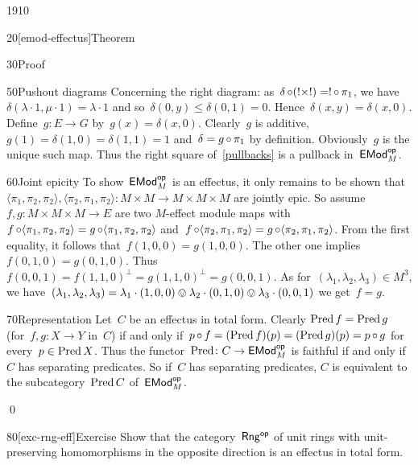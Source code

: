 \begin{parsec}{1910}
\begin{point}{20}[emod-effectus]{Theorem}
\begin{point}{30}{Proof}
\begin{point}{50}{Pushout diagrams}
Concerning the right diagram:
    as~$\delta \mathop{\circ} (!\times!) = ! \mathop{\circ} \pi_1$,
    we have~$\delta(\lambda \cdot 1, \mu \cdot 1) = \lambda \cdot 1$
    and so~$\delta(0, y) \leq \delta(0,1) = 0$.
    Hence~$\delta(x,y) = \delta(x,0)$.
Define~$g\colon E \to G$ by~$g(x) = \delta(x,0)$.
Clearly~$g$ is additive, $g(1) = \delta(1,0) = \delta(1,1) = 1$
    and~$\delta = g \mathop{\circ} \pi_1$ by definition.
Obviously~$g$ is the unique such map.
Thus the right square of~\eqref{pullbacks}
    is a pullback in~$\mathsf{EMod}_M^{\mathsf{op}}$.
\end{point}
\begin{point}{60}{Joint epicity}%
To show~$\mathsf{EMod}^{\mathsf{op}}_M$ is an effectus,
    it only remains to be shown
    that~$
    \langle \pi_1, \pi_2, \pi_2\rangle,
    \langle \pi_2, \pi_1, \pi_2\rangle\colon M \times M \to M \times M \times M
    $ are jointly epic.
So assume~$f,g\colon M \times M \times M \to E$
    are two $M$-effect module maps
    with~$
        f \mathop{\circ} \langle \pi_1,\pi_2,\pi_2\rangle =
        g \mathop{\circ} \langle \pi_1,\pi_2,\pi_2\rangle$
        and~$
        f \mathop{\circ} \langle \pi_2,\pi_1,\pi_2\rangle =
        g \mathop{\circ} \langle \pi_2,\pi_1,\pi_2\rangle$.
From the first equality, it follows that~$f(1,0,0) = g(1,0,0)$.
The other one implies~$f(0,1,0) = g(0,1,0)$.
Thus~$f(0,0,1) = f(1,1,0)^\perp = g(1,1,0)^\perp = g(0,0,1)$.
As for~$(\lambda_1,\lambda_2,\lambda_3) \in M^3$,
we have~$(\lambda_1,\lambda_2,\lambda_3)
            = \lambda_1 \cdot(1,0,0)
                \ovee \lambda_2\cdot (0,1,0)
                \ovee \lambda_3\cdot (0,0,1)$
    we get~$f=g$.
\end{point}
\begin{point}{70}{Representation}%
Let~$C$ be an effectus in total form.
Clearly $\operatorname{Pred} f = \operatorname{Pred} g $ (for~$f,g\colon X \to Y$ in~$C$)
if and only if~$p \mathop{\circ} f = (\operatorname{Pred} f)(p)= (\operatorname{Pred} g)(p) = p \mathop{\circ} g$
for every~$p \in \operatorname{Pred} X$.
Thus the functor~$\operatorname{Pred}\colon C \to \mathsf{EMod}^{\mathsf{op}}_M$
    is faithful if and only if~$C$ has separating predicates.
So if~$C$ has separating predicates,
    $C$ is equivalent to the subcategory~$\operatorname{Pred} C$
    of~$\mathsf{EMod}_M^{\mathsf{op}}$.
\end{point}
    \qed
\end{point}
\end{point}
\begin{point}{80}[exc-rng-eff]{Exercise}%
    Show that the category~${\mathsf{Rng}}{^{\mathsf{op}}}$ of unit rings 
    with unit-preserving homomorphisms in the opposite direction
    is an effectus in total form.
\begin{enumerate}

\end{enumerate}
\end{point}
\end{parsec}
